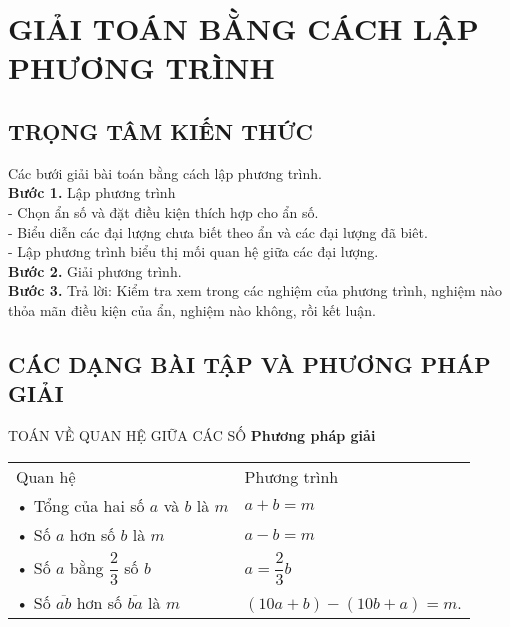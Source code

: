 \section{GIẢI TOÁN BẰNG CÁCH LẬP PHƯƠNG TRÌNH}
\subsection{TRỌNG TÂM KIẾN THỨC}
Các bưới giải bài toán bằng cách lập phương trình. \\
\textbf{Bước 1.} Lập phương trình \\
- Chọn ẩn số và đặt điều kiện thích hợp cho ẩn số. \\
- Biểu diễn các đại lượng chưa biết theo ẩn và các đại lượng đã biêt. \\
- Lập phương trình biểu thị mối quan hệ giữa các đại lượng. \\
\textbf{Bước 2.} Giải phương trình. \\
\textbf{Bước 3.} Trả lời: Kiểm tra xem trong các nghiệm của phương trình, nghiệm nào thỏa mãn điều kiện của ẩn, nghiệm nào không, rồi kết luận.
\subsection{CÁC DẠNG BÀI TẬP VÀ PHƯƠNG PHÁP GIẢI}
\begin{dang}{TOÁN VỀ QUAN HỆ GIỮA CÁC SỐ}
\textbf{Phương pháp giải}
\begin{center}
\begin{tabular}{l l}
Quan hệ & Phương trình \\
• Tổng của hai số $a$ và $b$ là $m$ & $a+b=m$ \\
• Số $a$ hơn số $b$ là $m$ & $a-b=m$ \\
• Số $a$ bằng $\dfrac{2}{3}$ số $b$ & $a=\dfrac{2}{3}b$ \\
• Số $\overline{ab}$ hơn số $\overline{ba}$ là $m$ & $(10a+b)-(10b+a)=m$.
\end{tabular}
\end{center}
\end{dang}

